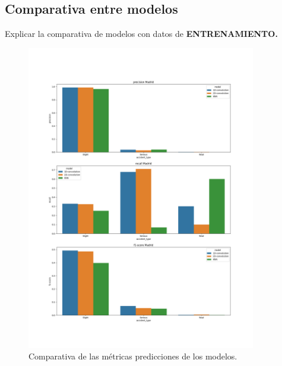   \subsection{Comparativa entre modelos}

    Explicar la comparativa de modelos con datos de \textbf{ENTRENAMIENTO.}


    \begin{figure}[h]
        \centering
        \includegraphics[width=10cm]{archivos/5.Resultados/Comparativa}
        \caption{Comparativa de las métricas predicciones de los modelos.}
        \label{ResultsImage}
     \end{figure}

